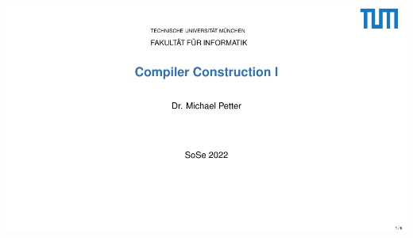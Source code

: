 \documentclass[10pt, landscape]{article}
\theoremstyle{definition}
\begin{document}
\begin{multicols*}{2}
\includegraphics[page=292, width=\columnwidth]{./selfservice-handout.pdf}







\end{multicols*}
\end{document}
